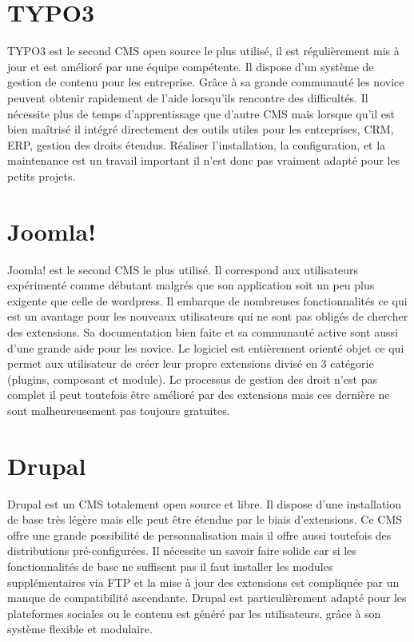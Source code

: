 \documentclass[a4paper,12pt]{report}
\begin{document}
\section{TYPO3}

TYPO3 est le second CMS open source le plus utilisé, il est
régulièrement mis à jour et est amélioré par une équipe compétente. Il
dispose d'un système de gestion de contenu pour les entreprise.  Grâce
à sa grande communauté les novice peuvent obtenir rapidement de l'aide
lorsqu'ils rencontre des difficultés.  Il nécessite plus de temps
d'apprentissage que d'autre CMS mais lorsque qu'il est bien maîtrisé
il intégré directement des outils utiles pour les entreprises, CRM,
ERP, gestion des droits étendus.  Réaliser l’installation, la
configuration, et la maintenance est un travail important il n'est
donc pas vraiment adapté pour les petits projets.


\section{Joomla!}

Joomla! est le second CMS le plus utilisé. Il correspond aux
utilisateurs expérimenté comme débutant malgrés que son application
soit un peu plus exigente que celle de wordpress. Il embarque de
nombreuses fonctionnalités ce qui est un avantage pour les nouveaux
utilisateurs qui ne sont pas obligés de chercher des extensions. Sa
documentation bien faite et sa communauté active sont aussi d'une
grande aide pour les novice.  Le logiciel est entièrement orienté
objet ce qui permet aux utilisateur de créer leur propre extensions
divisé en 3 catégorie (plugins, composant et module).  Le processus de
gestion des droit n'est pas complet il peut toutefois être amélioré
par des extensions mais ces dernière ne sont malheureusement pas
toujours gratuites.

\section{Drupal}

Drupal est un CMS totalement open source et libre. Il dispose d'une
installation de base très légère mais elle peut être étendue par le
biais d’extensions. Ce CMS offre une grande possibilité de
personnalisation mais il offre aussi toutefois des distributions
pré-configurées.  Il nécessite un savoir faire solide car si les
fonctionnalités de base ne suffisent pas il faut installer les modules
supplémentaires via FTP et la mise à jour des extensions est
compliquée par un manque de compatibilité ascendante.  Drupal est
particulièrement adapté pour les plateformes sociales ou le contenu
est généré par les utilisateurs, grâce à son système flexible et
modulaire.
\end{document}
